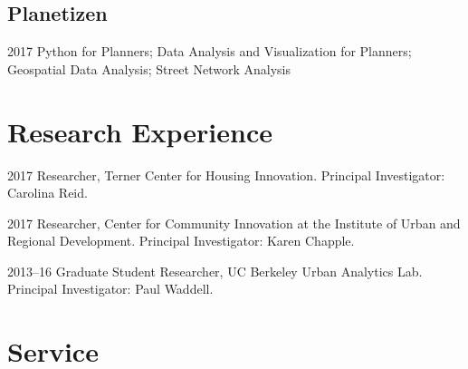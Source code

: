 \documentclass{academiccv}
\begin{document}
\subsection*{Planetizen}

\begin{tablist}

\item[2017]		\tab Python for Planners; Data Analysis and Visualization for Planners; Geospatial Data Analysis; Street Network Analysis

\end{tablist}



\section*{Research Experience}

\begin{tablist}
	
\item[2017] 	\tab Researcher, Terner Center for Housing Innovation. Principal Investigator: Carolina Reid.

\item[2017] 	\tab Researcher, Center for Community Innovation at the Institute of Urban and Regional Development. Principal Investigator: Karen Chapple.

\item[2013--16] \tab Graduate Student Researcher, UC Berkeley Urban Analytics Lab. Principal Investigator: Paul Waddell.

\end{tablist}



\section*{Service}
\end{document}
